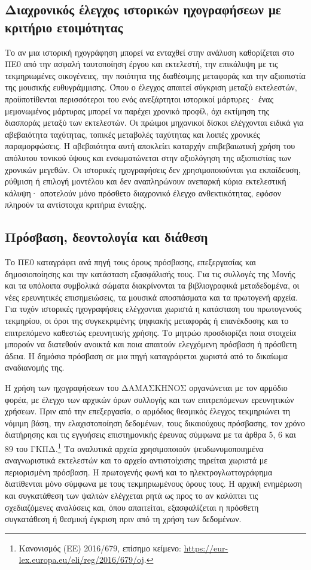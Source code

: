 \documentclass[11pt,a4paper]{article}
\begin{document}
\subsection{Διαχρονικός έλεγχος ιστορικών ηχογραφήσεων με κριτήριο ετοιμότητας}\label{app:historic-audio}
Το αν μια ιστορική ηχογράφηση μπορεί να ενταχθεί στην ανάλυση καθορίζεται στο ΠΕ0 από την ασφαλή ταυτοποίηση έργου και εκτελεστή, την επικάλυψη με τις τεκμηριωμένες οικογένειες, την ποιότητα της διαθέσιμης μεταφοράς και την αξιοπιστία της μουσικής ευθυγράμμισης. Όπου ο έλεγχος απαιτεί σύγκριση μεταξύ εκτελεστών, προϋποτίθενται περισσότεροι του ενός ανεξάρτητοι ιστορικοί μάρτυρες· ένας μεμονωμένος μάρτυρας μπορεί να παρέχει χρονικό προφίλ, όχι εκτίμηση της διασποράς μεταξύ των εκτελεστών. Οι πρώιμοι μηχανικοί δίσκοι ελέγχονται ειδικά για αβεβαιότητα ταχύτητας, τοπικές μεταβολές ταχύτητας και λοιπές χρονικές παραμορφώσεις. Η αβεβαιότητα αυτή αποκλείει καταρχήν επιβεβαιωτική χρήση του απόλυτου τονικού ύψους και ενσωματώνεται στην αξιολόγηση της αξιοπιστίας των χρονικών μεγεθών. Οι ιστορικές ηχογραφήσεις δεν χρησιμοποιούνται για εκπαίδευση, ρύθμιση ή επιλογή μοντέλου και δεν αναπληρώνουν ανεπαρκή κύρια εκτελεστική κάλυψη· αποτελούν μόνο πρόσθετο διαχρονικό έλεγχο ανθεκτικότητας, εφόσον πληρούν τα αντίστοιχα κριτήρια ένταξης.

\subsection{Πρόσβαση, δεοντολογία και διάθεση}\label{app:corpora-rights}

Το ΠΕ0 καταγράφει ανά πηγή τους όρους πρόσβασης, επεξεργασίας και δημοσιοποίησης και την κατάσταση εξασφάλισής τους. Για τις συλλογές της Μονής και τα υπόλοιπα συμβολικά σώματα διακρίνονται τα βιβλιογραφικά μεταδεδομένα, οι νέες ερευνητικές επισημειώσεις, τα μουσικά αποσπάσματα και τα πρωτογενή αρχεία. Για τυχόν ιστορικές ηχογραφήσεις ελέγχονται χωριστά η κατάσταση του πρωτογενούς τεκμηρίου, οι όροι της συγκεκριμένης ψηφιακής μεταφοράς ή επανέκδοσης και το επιτρεπόμενο καθεστώς ερευνητικής χρήσης. Το μητρώο προσδιορίζει ποια στοιχεία μπορούν να διατεθούν ανοικτά και ποια απαιτούν ελεγχόμενη πρόσβαση ή πρόσθετη άδεια. Η δημόσια πρόσβαση σε μια πηγή καταγράφεται χωριστά από το δικαίωμα αναδιανομής της.

Η χρήση των ηχογραφήσεων του ΔΑΜΑΣΚΗΝΟΣ οργανώνεται με τον αρμόδιο φορέα, με έλεγχο των αρχικών όρων συλλογής και των επιτρεπόμενων ερευνητικών χρήσεων. Πριν από την επεξεργασία, ο αρμόδιος θεσμικός έλεγχος τεκμηριώνει τη νόμιμη βάση, την ελαχιστοποίηση δεδομένων, τους δικαιούχους πρόσβασης, τον χρόνο διατήρησης και τις εγγυήσεις επιστημονικής έρευνας σύμφωνα με τα άρθρα 5, 6 και 89 του ΓΚΠΔ.\footnote{Κανονισμός (ΕΕ) 2016/679, επίσημο κείμενο: \url{https://eur-lex.europa.eu/eli/reg/2016/679/oj}.} Τα αναλυτικά αρχεία χρησιμοποιούν ψευδωνυμοποιημένα αναγνωριστικά εκτελεστών και το αρχείο αντιστοίχισης τηρείται χωριστά με περιορισμένη πρόσβαση. Η πρωτογενής φωνή και το ηλεκτρογλωττογράφημα διατίθενται μόνο σύμφωνα με τους τεκμηριωμένους όρους τους. Η αρχική ενημέρωση και συγκατάθεση των ψαλτών ελέγχεται ρητά ως προς το αν καλύπτει τις σχεδιαζόμενες αναλύσεις και, όπου απαιτείται, εξασφαλίζεται η πρόσθετη συγκατάθεση ή θεσμική έγκριση πριν από τη χρήση των δεδομένων.
\end{document}
